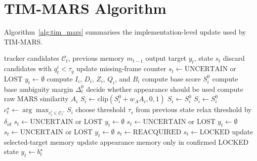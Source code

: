 \section{TIM-MARS Algorithm}

Algorithm~\ref{alg:tim_mars} summarises the implementation-level update used by TIM-MARS.

\begin{algorithm}[t]
\caption{TIM-MARS selected-target memory update}
\label{alg:tim_mars}
\begin{algorithmic}[1]
\REQUIRE tracker candidates $\mathcal{C}_t$, previous memory $m_{t-1}$
\ENSURE output target $y_t$, state $s_t$
\STATE discard candidates with $q_t^i < \tau_q$
    \STATE update missing-frame counter
    \STATE $s_t \leftarrow \mathrm{UNCERTAIN}$ or $\mathrm{LOST}$
    \STATE $y_t \leftarrow \emptyset$
    \RETURN
\ENDIF
{}
    \STATE compute $I_i$, $D_i$, $Z_i$, $Q_i$, and $B_i$
    \STATE compute base score $S_i^0$
\ENDFOR
\STATE compute base ambiguity margin $\Delta_t^0$
\STATE decide whether appearance should be used
        \STATE compute raw MARS similarity $A_i$
            \STATE $S_i \leftarrow \mathrm{clip}(S_i^0+w_AA_i,0,1)$
        \ELSE
            \STATE $S_i \leftarrow S_i^0$
        \ENDIF
    \ELSE
        \STATE $S_i \leftarrow S_i^0$
    \ENDIF
\ENDFOR
\STATE $c_t^\star \leftarrow \arg\max_{c_t^i \in \mathcal{C}_t'} S_i$
\STATE choose threshold $\tau_s$ from previous state
    \STATE relax threshold by $\delta_{id}$
\ENDIF
{}
    \STATE $s_t \leftarrow \mathrm{UNCERTAIN}$ or $\mathrm{LOST}$
    \STATE $y_t \leftarrow \emptyset$
    \RETURN
\ENDIF
{}
        \STATE $s_t \leftarrow \mathrm{UNCERTAIN}$ or $\mathrm{LOST}$
        \STATE $y_t \leftarrow \emptyset$
        \RETURN
    \ENDIF
        \STATE $s_t \leftarrow \mathrm{UNCERTAIN}$ or $\mathrm{LOST}$
        \STATE $y_t \leftarrow \emptyset$
        \RETURN
    \ENDIF
\ENDIF
{}
    \STATE $s_t \leftarrow \mathrm{REACQUIRED}$
\ELSE
    \STATE $s_t \leftarrow \mathrm{LOCKED}$
\ENDIF
\STATE update selected-target memory
\STATE update appearance memory only in confirmed LOCKED state
\STATE $y_t \leftarrow b_t^\star$
\end{algorithmic}
\end{algorithm}

